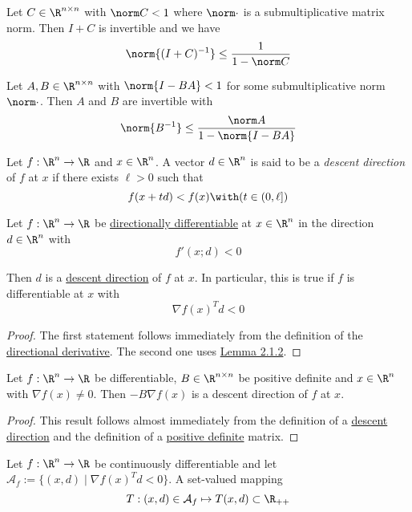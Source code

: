 \label{c733e75}

Let $C\in\R^{n\times n}$ with $\norm C<1$ where $\norm\cdot$ is a
submultiplicative matrix norm. Then $I+C$ is invertible and we have
$$
  \norm{(I+C)^{-1}}\leq\frac1{1-\norm C}
$$

\label{ae04fae}

Let $A,B\in\R^{n\times n}$ with $\norm{I-BA}<1$ for some submultiplicative norm
$\norm\cdot$. Then $A$ and $B$ are invertible with
$$
  \norm{B^{-1}}\leq\frac{\norm A}{1-\norm{I-BA}}
$$

\label{ac99a6d}

Let $f:\R^n\to\R$ and $x\in\R^n$. A vector $d\in\R^n$ is said to be a
\textit{descent direction} of $f$ at $x$ if there exists $\ell>0$ such that
$$
  f(x+td)<f(x)\with(t\in(0,\ell])
$$

\label{f81d53c}

Let $f:\R^n\to\R$ be \href{37eb747}{directionally differentiable} at $x\in\R^n$
in the direction $d\in\R^n$ with
$$
  f'(x;d)<0
$$

Then $d$ is a \href{ac99a6d}{descent direction} of $f$ at $x$. In particular,
this is true if $f$ is differentiable at $x$ with
$$
  \nabla f(x)^Td<0
$$

\begin{proof}
  The first statement follows immediately from the definition of the
  \href{37eb747}{directional derivative}. The second one uses
  \href{ed67d29}{Lemma 2.1.2}.
\end{proof}

\label{c41d0f0}

Let $f:\R^n\to\R$ be differentiable, $B\in\R^{n\times n}$ be positive definite
and $x\in\R^n$ with $\nabla f(x)\neq0$. Then $-B\nabla f(x)$ is a descent
direction of $f$ at $x$.

\begin{proof}
  This result follows almost immediately from the definition of a
  \href{37eb747}{descent direction} and the definition of a
  \href{e25e722}{positive definite} matrix.
\end{proof}

\label{ae4eac6}

Let $f:{\R}^n\to{\R}$ be continuously differentiable and let $\mathcal
A_f:=\{(x,d)\mid\nabla f(x)^Td<0\}$. A set-valued mapping
$$
  T:(x,d)\in\mathcal A_f\mapsto T(x,d)\subset\R_{++}
$$

